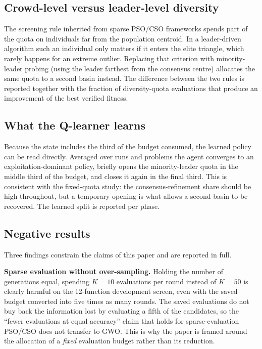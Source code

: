 \subsection{Crowd-level versus leader-level diversity}

The screening rule inherited from sparse PSO/CSO frameworks spends part of the
quota on individuals far from the population centroid. In a leader-driven
algorithm such an individual only matters if it enters the elite triangle, which
rarely happens for an extreme outlier. Replacing that criterion with
minority-leader probing (using the leader farthest from the consensus centre)
allocates the same quota to a second basin instead. The difference between the
two rules is reported together with the fraction of diversity-quota evaluations
that produce an improvement of the best verified fitness.

\subsection{What the Q-learner learns}

Because the state includes the third of the budget consumed, the learned policy
can be read directly. Averaged over runs and problems the agent converges to an
exploitation-dominant policy, briefly opens the minority-leader quota in the
middle third of the budget, and closes it again in the final third. This is
consistent with the fixed-quota study: the consensus-refinement share should be
high throughout, but a temporary opening is what allows a second basin to be
recovered. The learned split is reported per phase.

\subsection{Negative results}

Three findings constrain the claims of this paper and are reported in full.

\textbf{Sparse evaluation without over-sampling.} Holding the number of
generations equal, spending $K=10$ evaluations per round instead of $K=50$ is
clearly harmful on the 12-function development screen, even with the saved
budget converted into five times as many rounds. The saved evaluations do not
buy back the information lost by evaluating a fifth of the candidates, so the
``fewer evaluations at equal accuracy'' claim that holds for sparse-evaluation
PSO/CSO does not transfer to GWO. This is why the paper is framed around the
allocation of a \emph{fixed} evaluation budget rather than its reduction.

